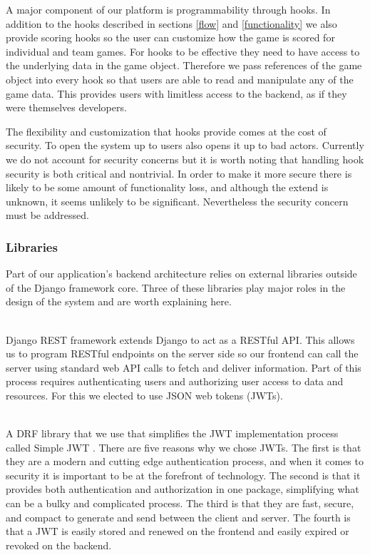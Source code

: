 \documentclass{article}
\begin{document}
            A major component of our platform is programmability through hooks. In addition to the hooks described in sections \ref{flow} and \ref{functionality} we also provide scoring hooks so the user can customize how the game is scored for individual and team games. For hooks to be effective they need to have access to the underlying data in the game object. Therefore we pass references of the game object into every hook so that users are able to read and manipulate any of the game data. This provides users with limitless access to the backend, as if they were themselves developers.
            \smallskip
            
            The flexibility and customization that hooks provide comes at the cost of security. To open the system up to users also opens it up to bad actors. Currently we do not account for security concerns but it is worth noting that handling hook security is both critical and nontrivial. In order to make it more secure there is likely to be some amount of functionality loss, and although the extend is unknown, it seems unlikely to be significant. Nevertheless the security concern must be addressed.
	    
		\subsubsection{Libraries}
		    Part of our application's backend architecture relies on external libraries outside of the Django framework core. Three of these libraries play major roles in the design of the system and are worth explaining here.
            \\\\
		    \smallskip

    	    Django REST framework extends Django to act as a RESTful API. This allows us to program RESTful endpoints on the server side so our frontend can call the server using standard web API calls to fetch and deliver information. Part of this process requires authenticating users and authorizing user access to data and resources. For this we elected to use JSON web tokens (JWTs).
            \\\\
    	    \smallskip

    	    A DRF library that we use that simplifies the JWT implementation process called Simple JWT \cite{simplejwt}. There are five reasons why we chose JWTs. The first is that they are a modern and cutting edge authentication process, and when it comes to security it is important to be at the forefront of technology. The second is that it provides both authentication and authorization in one package, simplifying what can be a bulky and complicated process. The third is that they are fast, secure, and compact to generate and send between the client and server. The fourth is that a JWT is easily stored and renewed on the frontend and easily expired or revoked on the backend.
            \\\\
    	    \smallskip
	    
\end{document}
